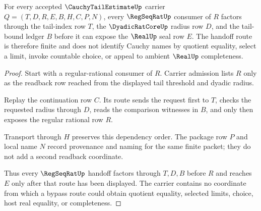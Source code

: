 \begin{theorem}
\label{thm:cauchy-tail-estimate-regseqrat-handoff}
For every accepted $\CauchyTailEstimateUp$ carrier $Q=(T,D,R,E,B,H,C,P,N)$, every $\RegSeqRatUp$ consumer of $R$ factors through the tail-index row $T$, the $\DyadicRatCoreUp$ radius row $D$, and the tail-bound ledger $B$ before it can expose the $\RealUp$ seal row $E$. The handoff route is therefore finite and does not identify Cauchy names by quotient equality, select a limit, invoke countable choice, or appeal to ambient $\RealUp$ completeness.
\end{theorem}
\begin{proof}
Start with a regular-rational consumer of $R$. Carrier admission lists $R$ only as the readback row reached from the displayed tail threshold and dyadic radius.

Replay the continuation row $C$. Its route sends the request first to $T$, checks the requested radius through $D$, reads the comparison witnesses in $B$, and only then exposes the regular rational row $R$.

Transport through $H$ preserves this dependency order. The package row $P$ and local name $N$ record provenance and naming for the same finite packet; they do not add a second readback coordinate.

Thus every $\RegSeqRatUp$ handoff factors through $T,D,B$ before $R$ and reaches $E$ only after that route has been displayed. The carrier contains no coordinate from which a bypass route could obtain quotient equality, selected limits, choice, host real equality, or completeness.
\end{proof}


\begin{closurestatus}{\CauchyTailEstimateUp}
  \theoryclosure{\seedClosure}
  \formalstatus{\unformalizedV}
\end{closurestatus}
